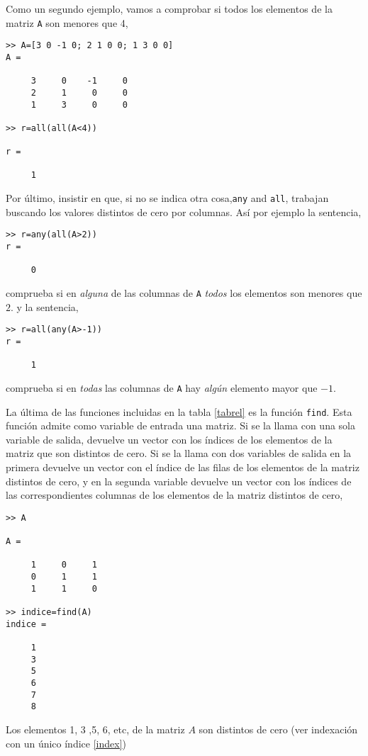 Como un segundo ejemplo, vamos a comprobar si todos los elementos de la matriz \texttt{A} son menores que 4,
\begin{verbatim}
>> A=[3 0 -1 0; 2 1 0 0; 1 3 0 0]
A =

     3     0    -1     0
     2     1     0     0
     1     3     0     0

>> r=all(all(A<4))

r =

     1
\end{verbatim}

Por último, insistir en que, si no se indica otra cosa,\texttt{any} and \texttt{all}, trabajan buscando los valores distintos de cero por columnas. Así por ejemplo la sentencia,
\begin{verbatim}
>> r=any(all(A>2))
r =

     0
\end{verbatim}
comprueba si en \emph{alguna} de las columnas de \texttt{A} \emph{todos} los elementos son menores que $2$. y la sentencia,
\begin{verbatim}
>> r=all(any(A>-1))
r =

     1
\end{verbatim}
comprueba si en \emph{todas} las columnas de \texttt{A} hay \emph{algún} elemento mayor que $-1$.

La última de las funciones incluidas en la tabla \ref{tabrel} es la función \texttt{find}. Esta función admite como variable de entrada una matriz. Si se la llama con una sola variable de salida, devuelve un vector con los índices de los elementos de la matriz que son distintos de cero. Si se la llama con dos variables de salida en la primera devuelve un vector con el índice de las filas de los elementos de la matriz distintos de cero, y en la segunda variable devuelve un vector con los índices de las correspondientes columnas de los elementos de la matriz distintos de cero,

\begin{verbatim}
>> A

A =

     1     0     1
     0     1     1
     1     1     0

>> indice=find(A)
indice =

     1
     3
     5
     6
     7
     8
\end{verbatim}

Los elementos 1, 3 ,5, 6, etc, de la matriz $A$ son distintos de cero (ver indexación con un único índice \ref{index})

